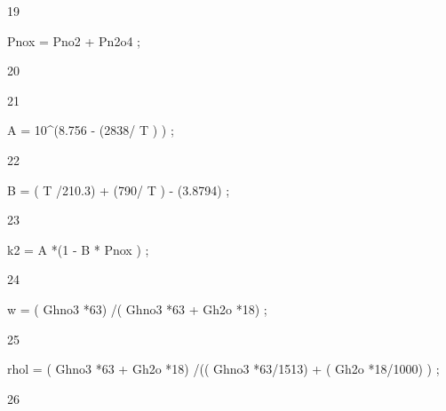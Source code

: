 \documentclass[a4paper,portrait,12pt]{article}
\begin{document}
19





\begin{flushleft}
Pnox = Pno2 + Pn2o4 ;
\end{flushleft}





20


21





\begin{flushleft}
A = 10\^{}(8.756 - (2838/ T ) ) ;
\end{flushleft}





22





\begin{flushleft}
B = ( T /210.3) + (790/ T ) - (3.8794) ;
\end{flushleft}





23





\begin{flushleft}
k2 = A *(1 - B * Pnox ) ;
\end{flushleft}





24





\begin{flushleft}
w = ( Ghno3 *63) /( Ghno3 *63 + Gh2o *18) ;
\end{flushleft}





25





\begin{flushleft}
rhol = ( Ghno3 *63 + Gh2o *18) /(( Ghno3 *63/1513) + ( Gh2o *18/1000) ) ;
\end{flushleft}





26
\end{document}
